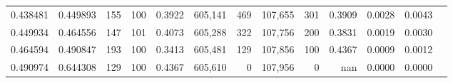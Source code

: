 \begin{tabular}{rrrrrrrrrrrrr}
0.438481 & 0.449893 &   155 & 100 &                                     0.3922 & 605,141 &     469 & 107,655 &     301 & 0.3909 & 0.0028 & 0.0043 \\
0.449934 & 0.464556 &   147 & 101 &                                     0.4073 & 605,288 &     322 & 107,756 &     200 & 0.3831 & 0.0019 & 0.0030 \\
0.464594 & 0.490847 &   193 & 100 &                                     0.3413 & 605,481 &     129 & 107,856 &     100 & 0.4367 & 0.0009 & 0.0012 \\
0.490974 & 0.644308 &   129 & 100 &                                     0.4367 & 605,610 &       0 & 107,956 &       0 &    nan & 0.0000 & 0.0000 \\
\bottomrule
\end{tabular}
